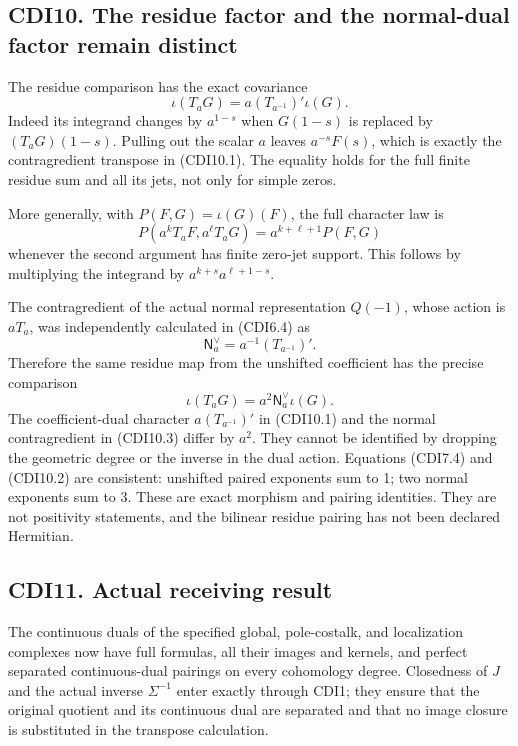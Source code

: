 \subsection{CDI10. The residue factor and the normal-dual factor remain
distinct}\label{cdi10.-the-residue-factor-and-the-normal-dual-factor-remain-distinct}

The residue comparison has the exact covariance \[
\boxed{\iota(T_aG)=a(T_{a^{-1}})'\iota(G).}
\tag{CDI10.1}
\] Indeed its integrand changes by \(a^{1-s}\) when \(G(1-s)\) is
replaced by \((T_aG)(1-s)\). Pulling out the scalar \(a\) leaves
\(a^{-s}F(s)\), which is exactly the contragredient transpose in
(CDI10.1). The equality holds for the full finite residue sum and all
its jets, not only for simple zeros.

More generally, with \(P(F,G)=\iota(G)(F)\), the full character law is
\[
P(a^kT_aF,a^\ell T_aG)=a^{k+\ell+1}P(F,G)
\tag{CDI10.2}
\] whenever the second argument has finite zero-jet support. This
follows by multiplying the integrand by \(a^{k+s}a^{\ell+1-s}\).

The contragredient of the actual normal representation \(Q(-1)\), whose
action is \(aT_a\), was independently calculated in (CDI6.4) as \[
\mathsf N_a^\vee=a^{-1}(T_{a^{-1}})'.
\tag{CDI10.3}
\] Therefore the same residue map from the unshifted coefficient has the
precise comparison \[
\iota(T_aG)=a^2\mathsf N_a^\vee\iota(G).
\tag{CDI10.4}
\] The coefficient-dual character \(a(T_{a^{-1}})'\) in (CDI10.1) and
the normal contragredient in (CDI10.3) differ by \(a^2\). They cannot be
identified by dropping the geometric degree or the inverse in the dual
action. Equations (CDI7.4) and (CDI10.2) are consistent: unshifted
paired exponents sum to 1; two normal exponents sum to 3. These are
exact morphism and pairing identities. They are not positivity
statements, and the bilinear residue pairing has not been declared
Hermitian.

\subsection{CDI11. Actual receiving
result}\label{cdi11.-actual-receiving-result}

The continuous duals of the specified global, pole-costalk, and
localization complexes now have full formulas, all their images and
kernels, and perfect separated continuous-dual pairings on every
cohomology degree. Closedness of \(J\) and the actual inverse
\(\Sigma^{-1}\) enter exactly through CDI1; they ensure that the
original quotient and its continuous dual are separated and that no
image closure is substituted in the transpose calculation.

